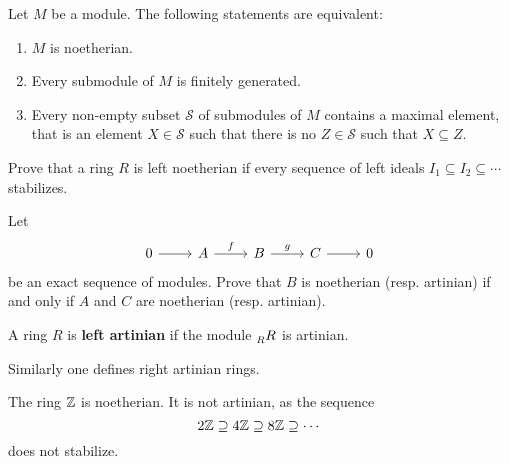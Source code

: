 
\begin{exercise}
    Let $M$ be a module. The following statements are equivalent:
    \begin{enumerate}
        \item $M$ is noetherian.
        \item Every submodule of $M$ is finitely generated. 
        \item Every non-empty subset $\mathcal{S}$ of submodules of $M$ contains a maximal element, that is
            an element $X\in\mathcal{S}$ such that there is no $Z\in\mathcal{S}$ such that $X\subseteq Z$.  
    \end{enumerate}
\end{exercise}

\begin{exercise}
    Prove that a ring $R$ is left noetherian if every sequence of 
    left ideals $I_1\subseteq I_2\subseteq\cdots$ stabilizes. 
\end{exercise}

\begin{exercise}
\label{xca:AN_exact}
	Let 
	\[
	\begin{tikzcd}
		0 \arrow{r}
		& A \arrow{r}{f}
		& B \arrow{r}{g}
		& C \arrow{r}
		& 0
	\end{tikzcd}
	\]
	be an exact sequence of modules. Prove that $B$ is noetherian (resp.
	artinian) if and only if $A$ and $C$ are noetherian (resp. artinian).
\end{exercise}


\begin{definition}
	A ring $R$ is \textbf{left artinian} if the module 
	$\prescript{}{R}R$ is artinian.
\end{definition}

Similarly one defines right artinian rings. 

\begin{example}
	The ring $\mathbb{Z}$ is noetherian. It is not artinian, as the sequence
	\[
	2\mathbb{Z}\supseteq
	4\mathbb{Z}\supseteq 8\mathbb{Z}\supseteq\cdots
	\]
	does not stabilize. 
\end{example}


